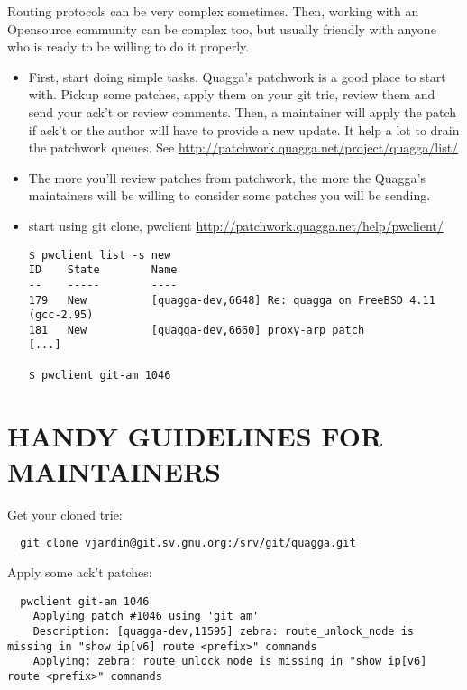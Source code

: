 \documentclass[oneside]{article}
\begin{document}
Routing protocols can be very complex sometimes. Then, working with an
Opensource community can be complex too, but usually friendly with
anyone who is ready to be willing to do it properly.

\begin{itemize}

  \item First, start doing simple tasks. Quagga's patchwork is a good place
        to start with. Pickup some patches, apply them on your git trie,
        review them and send your ack't or review comments. Then, a
        maintainer will apply the patch if ack't or the author will
        have to provide a new update. It help a lot to drain the
        patchwork queues.
        See \url{http://patchwork.quagga.net/project/quagga/list/}

  \item The more you'll review patches from patchwork, the more the
        Quagga's maintainers will be willing to consider some patches you will
        be sending.

  \item start using git clone, pwclient \url{http://patchwork.quagga.net/help/pwclient/}

\begin{verbatim}
$ pwclient list -s new
ID    State        Name
--    -----        ----
179   New          [quagga-dev,6648] Re: quagga on FreeBSD 4.11 (gcc-2.95)
181   New          [quagga-dev,6660] proxy-arp patch
[...]

$ pwclient git-am 1046
\end{verbatim}

\end{itemize}

\section{HANDY GUIDELINES FOR MAINTAINERS}

Get your cloned trie:
\begin{verbatim}
  git clone vjardin@git.sv.gnu.org:/srv/git/quagga.git
\end{verbatim}

Apply some ack't patches:
\begin{verbatim}
  pwclient git-am 1046
    Applying patch #1046 using 'git am'
    Description: [quagga-dev,11595] zebra: route_unlock_node is missing in "show ip[v6] route <prefix>" commands
    Applying: zebra: route_unlock_node is missing in "show ip[v6] route <prefix>" commands
\end{verbatim}
\end{document}

